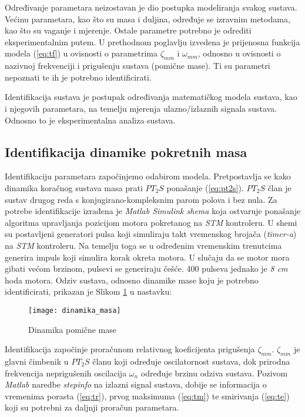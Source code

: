 \documentclass[11pt,a4paper]{article}
\begin{document}
Određivanje parametara neizostavan je dio postupka modeliranja svakog sustava. Većinu parametara, kao što su masa i duljina, određuje se izravnim metodama, kao što su vaganje i mjerenje. Ostale parametre potrebno je odrediti eksperimentalnim putem. U prethodnom poglavlju izvedena je prijenosna funkcija modela (\ref{eq:tf}) u ovisnosti o parametrima $\zeta_{mm}$ i $\omega_{mm}$, odnosno u ovisnosti o nazivnoj frekvenciji i prigušenju sustava (pomične mase). Ti su parametri nepoznati te ih je potrebno identificirati. 

\medskip

Identifikacija sustava je postupak određivanja matematičkog modela sustava, kao i njegovih parametara, na temelju mjerenja ulazno/izlaznih signala sustava. Odnosno to je eksperimentalna analiza sustava. \cite{te}

\medskip

\subsection{Identifikacija dinamike pokretnih masa}

Identifikaciju parametara započinjemo odabirom modela. Pretpostavlja se kako dinamika koračnog sustava masa prati $PT_{2}S$ ponašanje (\ref{eq:pt2s}). $PT_{2}S$ član je sustav drugog reda s konjugirano-kompleksnim parom polova i bez nula. \cite{aupr} Za potrebe identifikacije izrađena je \textit{Matlab Simulink shema} koja ostvaruje ponašanje algoritma upravljanja pozicijom motora pokretanog na \textit{STM} kontroleru. U shemi su postavljeni generatori pulsa koji simuliraju takt vremenskog brojača (\textit{timer-a}) na \textit{STM} kontroleru. Na temelju toga se u određenim vremenskim trenutcima generira impuls koji simulira korak okreta motora. U slučaju da se motor mora gibati većom brzinom, pulsevi se generiraju češće. 400 pulseva jednako je \textit{8 cm} hoda motora. Odziv sustava, odnosno dinamike mase koju je potrebno identificirati, prikazan je Slikom \ref{fig:masa} u nastavku:

\begin{figure}[H]
	\centering
	\texttt{[image: dinamika\_masa]}
	\caption{Dinamika pomične mase}
	\label{fig:masa}
\end{figure}


Identifikacija započinje proračunom relativnog koeficijenta prigušenja $\zeta_{mm}$. $\zeta_{mm}$ je glavni čimbenik u $PT_{2}S$ članu koji određuje oscilatornost sustava, dok prirodna frekvencija neprigušenih oscilacija $\omega_{n}$ određuje brzinu odziva sustava. \cite{aupr} Pozivom \textit{Matlab} naredbe \textit{stepinfo} na izlazni signal sustava, dobije se informacija o vremenima porasta (\ref{eq:tr}), prvog maksimuma (\ref{eq:tm}) te smirivanja (\ref{eq:te}) koji su potrebni za daljnji proračun parametara. 
\end{document}
